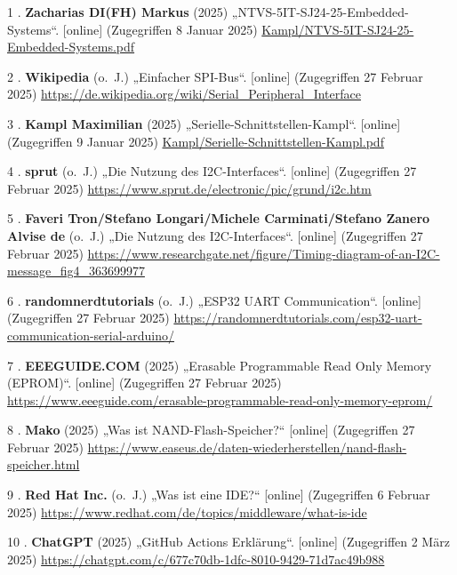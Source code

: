 \documentclass[
    headings=optiontotocandhead,%
    twoside,
    numbers=noenddot,%
    12pt, %
    titlepage, %
    parskip=full, %
    listof=leveldown, 
    numbers=noenddot, %
    a4paper,DIV=14,
    BCOR=15mm,
]{scrbook}
\newlength{\cslhangindent}
\newenvironment{cslreferences}%
  {\setlength{\parindent}{0pt}%
  \everypar{\setlength{\hangindent}{\cslhangindent}}\ignorespaces}%
  {\par}
\begin{document}
\hypertarget{refs}{}
\begin{cslreferences}
\leavevmode\hypertarget{ref-EmbeddedSystems}{}%
1 . \textbf{Zacharias DI(FH) Markus} (2025)
„NTVS-5IT-SJ24-25-Embedded-Systems``. {[}online{]} (Zugegriffen 8 Januar
2025) \url{Kampl/NTVS-5IT-SJ24-25-Embedded-Systems.pdf}

\leavevmode\hypertarget{ref-Serial-Peripheral-Interface-Grafik}{}%
2 . \textbf{Wikipedia} (o.~J.) „Einfacher SPI-Bus``. {[}online{]}
(Zugegriffen 27 Februar 2025)
\url{https://de.wikipedia.org/wiki/Serial_Peripheral_Interface}

\leavevmode\hypertarget{ref-Serielle-Schnittstellen}{}%
3 . \textbf{Kampl Maximilian} (2025) „Serielle-Schnittstellen-Kampl``.
{[}online{]} (Zugegriffen 9 Januar 2025)
\url{Kampl/Serielle-Schnittstellen-Kampl.pdf}

\leavevmode\hypertarget{ref-I2C-Bus-Grafik}{}%
4 . \textbf{sprut} (o.~J.) „Die Nutzung des I2C-Interfaces``.
{[}online{]} (Zugegriffen 27 Februar 2025)
\url{https://www.sprut.de/electronic/pic/grund/i2c.htm}

\leavevmode\hypertarget{ref-I2C-TimerDiagramm}{}%
5 . \textbf{Faveri Tron/Stefano Longari/Michele Carminati/Stefano Zanero
Alvise de} (o.~J.) „Die Nutzung des I2C-Interfaces``. {[}online{]}
(Zugegriffen 27 Februar 2025)
\url{https://www.researchgate.net/figure/Timing-diagram-of-an-I2C-message_fig4_363699977}

\leavevmode\hypertarget{ref-UART-Grafik}{}%
6 . \textbf{randomnerdtutorials} (o.~J.) „ESP32 UART Communication``.
{[}online{]} (Zugegriffen 27 Februar 2025)
\url{https://randomnerdtutorials.com/esp32-uart-communication-serial-arduino/}

\leavevmode\hypertarget{ref-EPROM}{}%
7 . \textbf{EEEGUIDE.COM} (2025) „Erasable Programmable Read Only Memory
(EPROM)``. {[}online{]} (Zugegriffen 27 Februar 2025)
\url{https://www.eeeguide.com/erasable-programmable-read-only-memory-eprom/}

\leavevmode\hypertarget{ref-FLASH}{}%
8 . \textbf{Mako} (2025) „Was ist NAND-Flash-Speicher?{}`` {[}online{]}
(Zugegriffen 27 Februar 2025)
\url{https://www.easeus.de/daten-wiederherstellen/nand-flash-speicher.html}

\leavevmode\hypertarget{ref-RedHatIDE}{}%
9 . \textbf{Red Hat Inc.} (o.~J.) „Was ist eine IDE?{}`` {[}online{]}
(Zugegriffen 6 Februar 2025)
\url{https://www.redhat.com/de/topics/middleware/what-is-ide}

\leavevmode\hypertarget{ref-gpt-inifile}{}%
10 . \textbf{ChatGPT} (2025) „GitHub Actions Erklärung``. {[}online{]}
(Zugegriffen 2 März 2025)
\url{https://chatgpt.com/c/677c70db-1dfc-8010-9429-71d7ac49b988}


\end{cslreferences}
\end{document}
